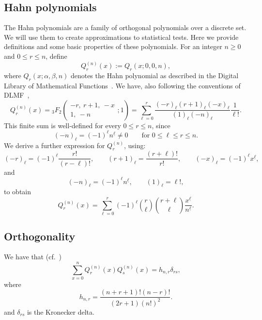 \documentclass[manuscript,nonacm]{acmart}
\begin{document}
\subsection{Hahn polynomials}
The Hahn polynomials are a family of orthogonal polynomials over a discrete set. We will use them to create approximations to statistical tests. Here we provide definitions and some basic properties of these polynomials. For an integer $n\ge 0$ and $0\le r\le n$, define
\[
    Q_r^{(n)}(x)
    :=
    Q_r(x;0,0,n),
\]
where $Q_r(x;\alpha,\beta,n)$ denotes the Hahn polynomial as described in the Digital Library of Mathematical Functions~\cite{NIST:DLMF}.  We have, also following the conventions of DLMF~\cite[§18.20(ii),(18.20.5)]{NIST:DLMF}, 
\[
    Q_r^{(n)}(x)
    =
    {}_3F_2\!\left(
        \begin{matrix}
            -r,\ r+1,\ -x\\
            1,\ -n
        \end{matrix}
        ;1
    \right)
    =
    \sum_{\ell=0}^{r}
    \frac{(-r)_\ell(r+1)_\ell(-x)_\ell}
         {(1)_\ell(-n)_\ell}
    \frac{1}{\ell!}.
\]
This finite sum is well-defined for every \(0\le r\le n\), since
\[
    (-n)_\ell=(-1)^\ell n^{\underline \ell}\neq 0
    \qquad
    \text{for }0\le \ell\le r\le n.
\]
We derive a further expression for $Q_r^{(n)}$, using:
\[
    (-r)_\ell=(-1)^\ell \frac{r!}{(r-\ell)!},
    \qquad
    (r+1)_\ell=\frac{(r+\ell)!}{r!},
    \qquad
    (-x)_\ell=(-1)^\ell x^{\underline \ell},
\]
and
\[
    (-n)_\ell=(-1)^\ell n^{\underline \ell},
    \qquad
    (1)_\ell=\ell!,
\]
to obtain
\begin{equation}
\label{eq:uniform-hahn-definition}
    Q_r^{(n)}(x)
    =
    \sum_{\ell=0}^r
    (-1)^\ell
    \binom r\ell
    \binom{r+\ell}{\ell}
    \frac{x^{\underline{\ell}}}{n^{\underline{\ell}}}.
\end{equation}

\subsection{Orthogonality}
We have that (cf.~\cite[§18.19]{NIST:DLMF})
\begin{equation}
\label{eq:hahn-orthogonality-unnormalized}
    \sum_{x=0}^n
    Q_r^{(n)}(x)Q_s^{(n)}(x)
    =
    h_{n,r}\delta_{rs},
\end{equation}
where
\begin{equation}
\label{eq:hahn-unnormalized-norm}
    h_{n,r}
    =
    \frac{(n+r+1)!(n-r)!}{(2r+1)(n!)^2}.
\end{equation}
and $\delta_{rs}$ is the Kronecker delta.
\end{document}
